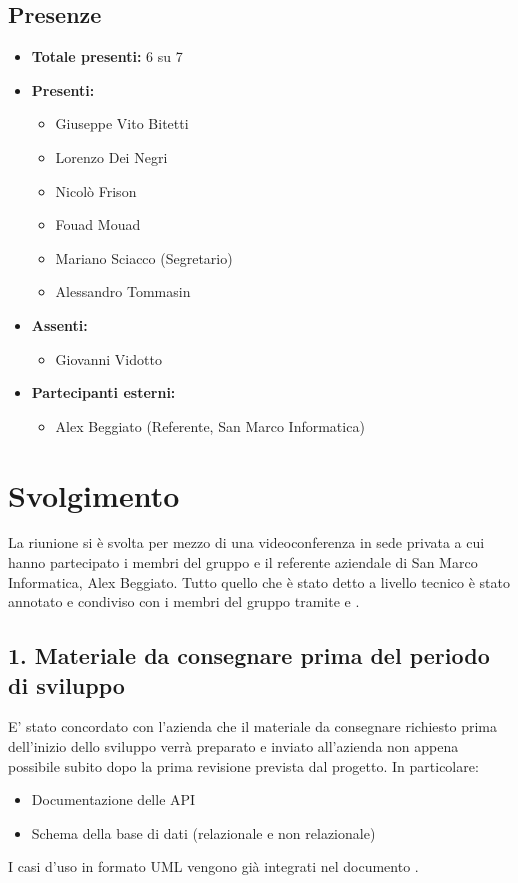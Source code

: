 \subsection*{Presenze}
	\begin{itemize}
		\item \textbf{Totale presenti:} 6 su 7
		\item \textbf{Presenti: }
			\begin{itemize}			
				\item Giuseppe Vito Bitetti
				\item Lorenzo Dei Negri
				\item Nicolò Frison
				\item Fouad Mouad
				\item Mariano Sciacco (Segretario)
				\item Alessandro Tommasin
			\end{itemize}
		\item \textbf{Assenti: } 
			\begin{itemize}	
				\item Giovanni Vidotto
			\end{itemize}
		\item \textbf{Partecipanti esterni:}
			\begin{itemize}
				\item Alex Beggiato (Referente, San Marco Informatica)
			\end{itemize}
	\end{itemize}


\newpage
\section*{Svolgimento}

	La riunione si è svolta per mezzo di una videoconferenza in sede privata a cui hanno partecipato i membri del gruppo e il referente aziendale di San Marco Informatica, Alex Beggiato. Tutto quello che è stato detto a livello tecnico è stato annotato e condiviso con i membri del gruppo tramite  e .

	\subsection*{1. Materiale da consegnare prima del periodo di sviluppo}

	E' stato concordato con l'azienda che il materiale da consegnare richiesto prima dell'inizio dello sviluppo verrà preparato e inviato all'azienda non appena possibile subito dopo la prima revisione prevista dal progetto. In particolare:
	\begin{itemize}
		\item Documentazione delle API
		\item Schema della base di dati (relazionale e non relazionale)
	\end{itemize}
	I casi d'uso in formato UML vengono già integrati nel documento .

